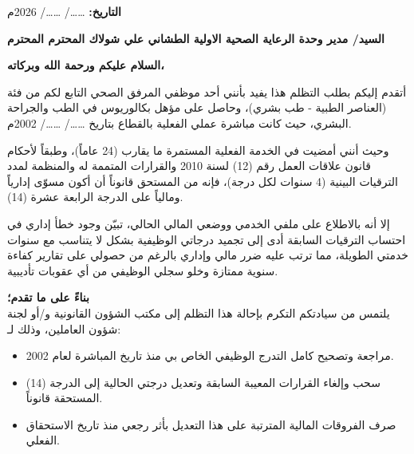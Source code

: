 \documentclass[12pt, a4paper]{article}
\begin{document}
\noindent \textbf{التاريخ:} \hspace{0.2cm} \dots\dots / \dots\dots / 2026م

\vspace{1cm}

\noindent \textbf{السيد/ مدير وحدة الرعاية الصحية الاولية الطشاني علي شولاك المحترم \dotfill المحترم} 

\vspace{0.8cm}

\begin{center}
    \textbf{السلام عليكم ورحمة الله وبركاته،}
\end{center}

\vspace{0.4cm}


\vspace{0.6cm}

أتقدم إليكم بطلب التظلم هذا يفيد بأنني أحد موظفي المرفق الصحي التابع لكم من فئة (العناصر الطبية - طب بشري)، وحاصل على مؤهل بكالوريوس في الطب والجراحة البشري، حيث كانت مباشرة عملي الفعلية بالقطاع بتاريخ \dots\dots / \dots\dots / 2002م.
    
\vspace{0.3cm}

وحيث أنني أمضيت في الخدمة الفعلية المستمرة ما يقارب (24 عاماً)، وطبقاً لأحكام قانون علاقات العمل رقم (12) لسنة 2010 والقرارات المتممة له والمنظمة لمدد الترقيات البينية (4 سنوات لكل درجة)، فإنه من المستحق قانوناً أن أكون مسوّى إدارياً ومالياً على الدرجة الرابعة عشرة (14).
    
\vspace{0.3cm}

إلا أنه بالاطلاع على ملفي الخدمي ووضعي المالي الحالي، تبيّن وجود خطأ إداري في احتساب الترقيات السابقة أدى إلى تجميد درجاتي الوظيفية بشكل لا يتناسب مع سنوات خدمتي الطويلة، مما ترتب عليه ضرر مالي وإداري بالرغم من حصولي على تقارير كفاءة سنوية ممتازة وخلو سجلي الوظيفي من أي عقوبات تأديبية.

\vspace{0.6cm}

\textbf{بناءً على ما تقدم؛} \\
يلتمس من سيادتكم التكرم بإحالة هذا التظلم إلى مكتب الشؤون القانونية و/أو لجنة شؤون العاملين، وذلك لـ:

\begin{itemize}
    \item مراجعة وتصحيح كامل التدرج الوظيفي الخاص بي منذ تاريخ المباشرة لعام 2002.
    \item سحب وإلغاء القرارات المعيبة السابقة وتعديل درجتي الحالية إلى الدرجة (14) المستحقة قانوناً.
    \item صرف الفروقات المالية المترتبة على هذا التعديل بأثر رجعي منذ تاريخ الاستحقاق الفعلي.
\end{itemize}
\end{document}
